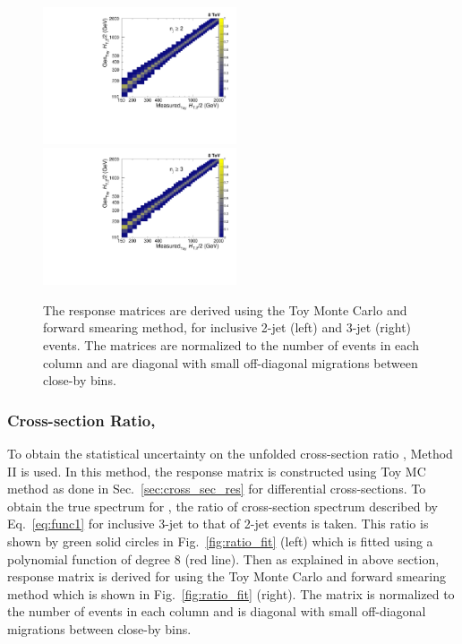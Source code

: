 \begin{figure}[!htbp]
 \begin{center}
 \includegraphics[width=0.51\textwidth]{Plots_HT_2_150/Normalized_Response_Matrix_NLO_2_range_column.pdf}%
 ~~\includegraphics[width=0.51\textwidth]{Plots_HT_2_150/Normalized_Response_Matrix_NLO_3_column.pdf} 
 \caption[The response matrices are derived using the Toy Monte Carlo and forward smearing method.]{The response matrices are derived using the Toy Monte Carlo and forward smearing method, for inclusive 2-jet (left) and 3-jet (right) events. The matrices are normalized to the number of events in each column and are diagonal with small off-diagonal migrations between close-by \httwo bins.}
 \label{fig:response_NLO}
 \end{center}
\end{figure}

\subsubsection{Cross-section Ratio, \texorpdfstring{\ratio}{R-32)}}
To obtain the statistical uncertainty on the unfolded cross-section ratio \rations, Method II is used. In this method, the response matrix is constructed using Toy MC method as done in Sec.~\ref{sec:cross_sec_res} for differential cross-sections. To obtain the true spectrum for \rations, the ratio of cross-section spectrum described by Eq.~\ref{eq:func1} for inclusive 3-jet to that of 2-jet events is taken. This ratio is shown by green solid circles in Fig.~\ref{fig:ratio_fit} (left) which is fitted using a polynomial function of degree 8 (red line). Then as explained in above section, response matrix is derived for \ratio using the Toy Monte Carlo and forward smearing method which is shown in Fig.~\ref{fig:ratio_fit} (right). The matrix is normalized to the number of events in each column and is diagonal with small off-diagonal migrations between close-by \httwo bins.

